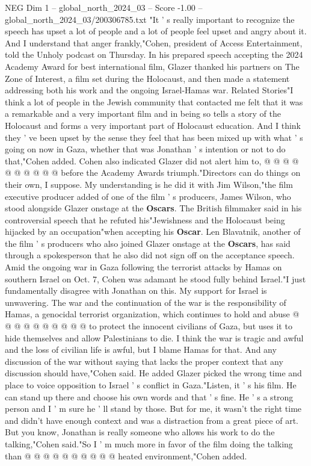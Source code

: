 \begin{textsample}{NEG Dim 1 – global\_north\_2024\_03 – Score -1.00 – global\_north\_2024\_03/200306785.txt}  \label{ex:f1_neg_072}
"It ' s really important to recognize the speech has upset a lot of people and a lot of people feel upset and angry about it.
And I understand that anger frankly,"Cohen, president of Access Entertainment, told the Unholy podcast on Thursday.
In his prepared speech accepting the 2024 Academy Award for best international film, Glazer thanked his partners on The Zone of Interest, a film set during the Holocaust, and then made a statement addressing both his work and the ongoing Israel-Hamas war.
Related Stories"I think a lot of people in the Jewish community that contacted me felt that it was a remarkable and a very important film and in being so tells a story of the Holocaust and forms a very important part of Holocaust education.
And I think they ' ve been upset by the sense they feel that has been mixed up with what ' s going on now in Gaza, whether that was Jonathan ' s intention or not to do that,"Cohen added.
Cohen also indicated Glazer did not alert him to, @ @ @ @ @ @ @ @ @ @ before the Academy Awards triumph."Directors can do things on their own, I suppose.
My understanding is he did it with Jim Wilson,"the film executive producer added of one of the film ' s producers, James Wilson, who stood alongside Glazer onstage at the \textbf{Oscars}.
The British filmmaker said in his controversial speech that he refuted his"Jewishness and the Holocaust being hijacked by an occupation"when accepting his \textbf{Oscar}.
Len Blavatnik, another of the film ' s producers who also joined Glazer onstage at the \textbf{Oscars}, has said through a spokesperson that he also did not sign off on the acceptance speech.
Amid the ongoing war in Gaza following the terrorist attacks by Hamas on southern Israel on Oct. 7, Cohen was adamant he stood fully behind Israel."I just fundamentally disagree with Jonathan on this.
My support for Israel is unwavering.
The war and the continuation of the war is the responsibility of Hamas, a genocidal terrorist organization, which continues to hold and abuse @ @ @ @ @ @ @ @ @ @ to protect the innocent civilians of Gaza, but uses it to hide themselves and allow Palestinians to die.
I think the war is tragic and awful and the loss of civilian life is awful, but I blame Hamas for that.
And any discussion of the war without saying that lacks the proper context that any discussion should have,"Cohen said.
He added Glazer picked the wrong time and place to voice opposition to Israel ' s conflict in Gaza."Listen, it ' s his film.
He can stand up there and choose his own words and that ' s fine.
He ' s a strong person and I ' m sure he ' ll stand by those.
But for me, it wasn't the right time and didn't have enough context and was a distraction from a great piece of art.
But you know, Jonathan is really someone who allows his work to do the talking,"Cohen said."So I ' m much more in favor of the film doing the talking than @ @ @ @ @ @ @ @ @ @ heated environment,"Cohen added.

\end{textsample}
